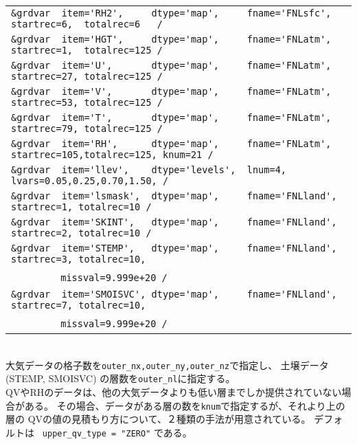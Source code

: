 {{{\begin{tabularx}{150mm}{l}
\verb|&grdvar  item='RH2',     dtype='map',     fname='FNLsfc', startrec=6,  totalrec=6   / |  \\
\verb|&grdvar  item='HGT',     dtype='map',     fname='FNLatm', startrec=1,  totalrec=125 / |  \\
\verb|&grdvar  item='U',       dtype='map',     fname='FNLatm', startrec=27, totalrec=125 / |  \\
\verb|&grdvar  item='V',       dtype='map',     fname='FNLatm', startrec=53, totalrec=125 / |  \\
\verb|&grdvar  item='T',       dtype='map',     fname='FNLatm', startrec=79, totalrec=125 / |  \\
\verb|&grdvar  item='RH',      dtype='map',     fname='FNLatm', startrec=105,totalrec=125, knum=21 /  |  \\
\verb|&grdvar  item='llev',    dtype='levels',  lnum=4, lvars=0.05,0.25,0.70,1.50, /        |  \\
\verb|&grdvar  item='lsmask',  dtype='map',     fname='FNLland', startrec=1, totalrec=10 /  |  \\
\verb|&grdvar  item='SKINT',   dtype='map',     fname='FNLland', startrec=2, totalrec=10 /  |  \\
\verb|&grdvar  item='STEMP',   dtype='map',     fname='FNLland', startrec=3, totalrec=10,|\\
~~~~~~~~\verb| missval=9.999e+20 /|  \\
\verb|&grdvar  item='SMOISVC', dtype='map',     fname='FNLland', startrec=7, totalrec=10,|\\
~~~~~~~~\verb| missval=9.999e+20 /|  \\
\end{tabularx}
}}}\\

大気データの格子数を\verb|outer_nx,outer_ny,outer_nz|で指定し、
土壌データ(STEMP, SMOISVC) の層数を\verb|outer_nl|に指定する。\\
QVやRHのデータは、他の大気データよりも低い層までしか提供されていない場合がある。
その場合、データがある層の数を\verb|knum|で指定するが、それより上の層の
QVの値の見積もり方について、２種類の手法が用意されている。
デフォルトは \verb| upper_qv_type = "ZERO"| である。\\

\\

